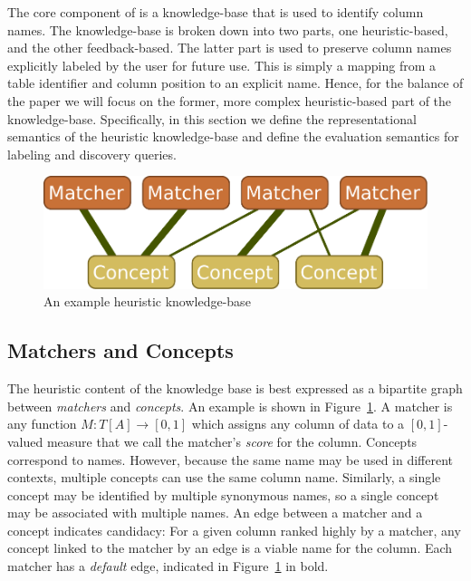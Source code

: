 

The core component of \systemname is a knowledge-base that is used to identify column names.
The knowledge-base is broken down into two parts, one heuristic-based, and the other feedback-based.
The latter part is used to preserve column names explicitly labeled by the user for future use.  
This is simply a mapping from a table identifier and column position to an explicit name.  
Hence, for the balance of the paper we will focus on the former, more complex heuristic-based part of the \systemname knowledge-base.
Specifically, in this section we define the representational semantics of the heuristic knowledge-base and define the evaluation semantics for labeling and discovery queries.


\begin{figure}
\centering
\includegraphics[width=0.8\columnwidth]{graphics/knowledgebase}
\caption{An example \systemname heuristic knowledge-base}
\label{fig:bipartitekb}
\end{figure}

\subsection{Matchers and Concepts}

The heuristic content of the knowledge base is best expressed as a bipartite graph between \emph{matchers} and \emph{concepts}.
An example is shown in Figure~\ref{fig:bipartitekb}.  
A matcher is any function $M : T[A] \rightarrow [0,1]$ which assigns any column of data to a $[0,1]$-valued measure that we call the matcher's \emph{score} for the column.  
Concepts correspond to names.
However, because the same name may be used in different contexts, multiple concepts can use the same column name.
Similarly, a single concept may be identified by multiple synonymous names, so a single concept may be associated with multiple names.
An edge between a matcher and a concept indicates candidacy:
For a given column ranked highly by a matcher, any concept linked to the matcher by an edge is a viable name for the column.
Each matcher has a \emph{default} edge, indicated in Figure~\ref{fig:bipartitekb} in bold.

